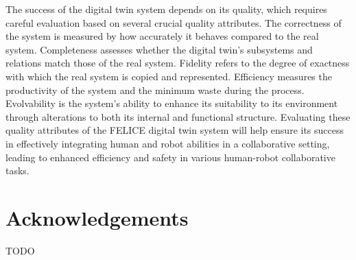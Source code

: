 \documentclass{llncs}
\begin{document}
    The success of the digital twin system depends on its quality, which requires careful evaluation based on several crucial quality attributes. The correctness of the system is measured by how accurately it behaves compared to the real system.
    Completeness assesses whether the digital twin's subsystems and relations match those of the real system. 
    Fidelity refers to the degree of exactness with which the real system is copied and represented.
    Efficiency measures the productivity of the system and the minimum waste during the process. 
    Evolvability is the system's ability to enhance its suitability to its environment through alterations to both its internal and functional structure. 
    Evaluating these quality attributes of the FELICE digital twin system will help ensure its success in effectively integrating human and robot abilities in a collaborative setting, leading to enhanced efficiency and safety in various human-robot collaborative tasks.
    \section*{Acknowledgements}
    TODO

    
    
\end{document}
